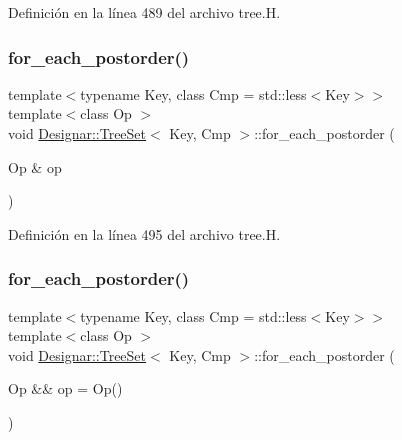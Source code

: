 Definición en la línea 489 del archivo tree.\+H.

\mbox{\label{class_designar_1_1_tree_set_ab59aacf4ca7cfe6c3753b5c4bd6c45e8}} 
\subsubsection{\texorpdfstring{for\+\_\+each\+\_\+postorder()}{for\_each\_postorder()}\hspace{0.1cm}{\footnotesize\ttfamily [1/2]}}
{\footnotesize\ttfamily template$<$typename Key, class Cmp = std\+::less$<$\+Key$>$$>$ \\
template$<$class Op $>$ \\
void \hyperlink{class_designar_1_1_tree_set}{Designar\+::\+Tree\+Set}$<$ Key, Cmp $>$\+::for\+\_\+each\+\_\+postorder (\begin{DoxyParamCaption}\item[{Op \&}]{op }\end{DoxyParamCaption})\hspace{0.3cm}{\ttfamily [inline]}}



Definición en la línea 495 del archivo tree.\+H.

\mbox{\label{class_designar_1_1_tree_set_ae00442533ecacddca2c61bfbbc2c0c94}} 
\subsubsection{\texorpdfstring{for\+\_\+each\+\_\+postorder()}{for\_each\_postorder()}\hspace{0.1cm}{\footnotesize\ttfamily [2/2]}}
{\footnotesize\ttfamily template$<$typename Key, class Cmp = std\+::less$<$\+Key$>$$>$ \\
template$<$class Op $>$ \\
void \hyperlink{class_designar_1_1_tree_set}{Designar\+::\+Tree\+Set}$<$ Key, Cmp $>$\+::for\+\_\+each\+\_\+postorder (\begin{DoxyParamCaption}\item[{Op \&\&}]{op = {\ttfamily Op()} }\end{DoxyParamCaption})\hspace{0.3cm}{\ttfamily [inline]}}



